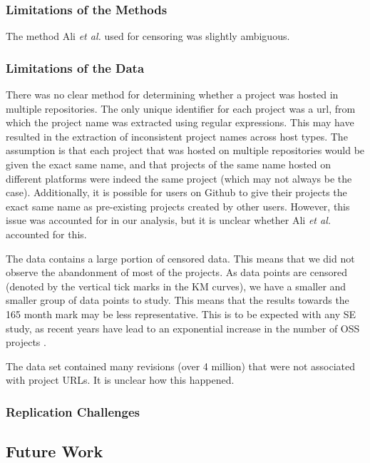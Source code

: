 \documentclass[acmconf]{acmart}
\begin{document}
\subsubsection{Limitations of the Methods}

The method Ali \emph{et al.} used for censoring was slightly ambiguous.

\subsubsection{Limitations of the Data}

There was no clear method for determining whether a project was hosted in multiple repositories.
The only unique identifier for each project was a url, from which the project name was extracted using regular expressions.
This may have resulted in the extraction of inconsistent project names across host types.
The assumption is that each project that was hosted on multiple repositories would be given the exact same name, and that projects of the same name hosted on different platforms were indeed the same project (which may not always be the case).
Additionally, it is possible for users on Github to give their projects the exact same name as pre-existing projects created by other users.
However, this issue was accounted for in our analysis, but it is unclear whether Ali \emph{et al.} accounted for this.

The data contains a large portion of censored data.
This means that we did not observe the abandonment of most of the projects.
As data points are censored (denoted by the vertical tick marks in the KM curves), we have a smaller and smaller group of data points to study.
This means that the results towards the 165 month mark may be less representative.
This is to be expected with any SE study, as recent years have lead to an exponential increase in the number of OSS projects .


The data set contained many revisions (over 4 million) that were not associated with project URLs.
It is unclear how this happened.

\subsubsection{Replication Challenges}

\subsection{Future Work}
\end{document}
